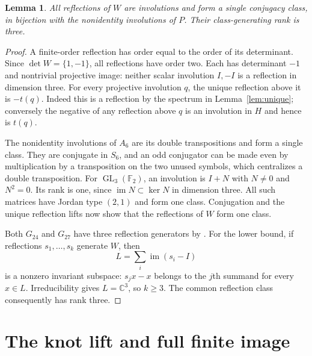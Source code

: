 \documentclass[11pt]{article}
\newtheorem{lemma}[theorem]{Lemma}
\newcommand{\C}{\mathbb C}
\newcommand{\F}{\mathbb F}
\newcommand{\GL}{\operatorname{GL}}
\begin{document}
\begin{lemma}\label{lem:class}
All reflections of $W$ are involutions and form a single conjugacy
class, in bijection with the nonidentity involutions of $P$.
Their class-generating rank is three.
\end{lemma}
\begin{proof}
A finite-order reflection has order equal to the order of its
determinant. Since $\det W=\{1,-1\}$, all reflections have order two.
Each has determinant $-1$ and nontrivial projective image: neither
scalar involution $I,-I$ is a reflection in dimension three.
For every projective involution $q$, the unique reflection above
it is $-t(q)$. Indeed this is a reflection by the spectrum in
Lemma~\ref{lem:unique}; conversely the negative of any reflection
above $q$ is an involution in $H$ and hence is $t(q)$.

The nonidentity involutions of $A_6$ are its double transpositions
and form a single class. They are conjugate in $S_6$, and an odd
conjugator can be made even by multiplication by a transposition
on the two unused symbols, which centralizes a double transposition.
For $\GL_3(\F_2)$, an involution is $I+N$ with $N\ne0$ and $N^2=0$.
Its rank is one, since $\operatorname{im}N\subset\ker N$ in dimension
three. All such matrices have Jordan type $(2,1)$ and form one class.
Conjugation and the unique reflection lifts now show that the
reflections of $W$ form one class.

Both $G_{24}$ and $G_{27}$ have three reflection generators by
\cite[Table~VII and its complete exception footnote, printed p.~301]{st54}.
For the lower bound, if reflections $s_1,\ldots,s_k$ generate $W$,
then
\[
                  L=\sum_i\operatorname{im}(s_i-I)
\]
is a nonzero invariant subspace: $s_jx-x$ belongs to the $j$th
summand for every $x\in L$. Irreducibility gives $L=\C^3$, so
$k\ge3$. The common reflection class consequently has rank three.
\end{proof}

\section{The knot lift and full finite image}
\end{document}
